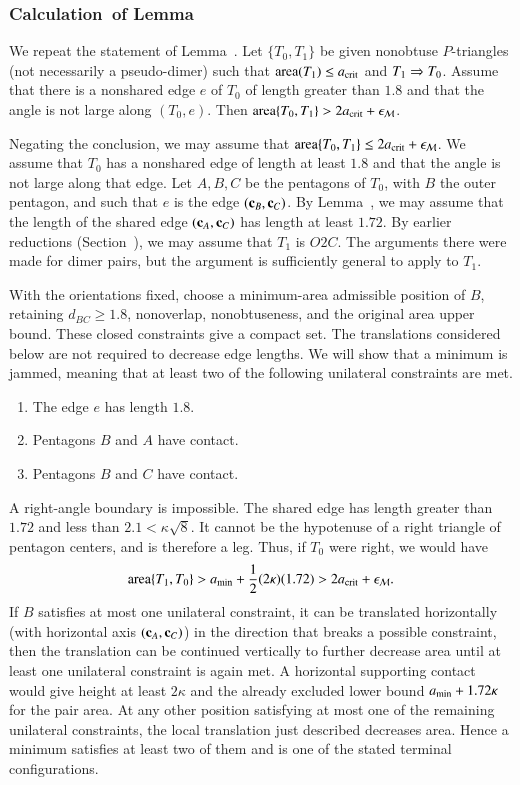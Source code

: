 \subsubsection{Calculation~of Lemma~} %

We repeat the statement of Lemma~.  Let $\{T_0,T_1\}$
be given nonobtuse $P$-triangles (not necessarily a pseudo-dimer) such that
${\operatorname{area}}(T_1)\le a_\text{crit}$ and $T_1\Rightarrow T_0$.  Assume that there is a
nonshared edge $e$ of $T_0$ of length greater than $1.8$ and that the
angle is not large along $(T_0,e)$.  Then ${\operatorname{area}}\{T_0,T_1\} > 2a_\text{crit}
+ \epsilon_{\mathcal M}$. %

Negating the conclusion, we may assume that ${\operatorname{area}}\{T_0,T_1\}\le
2a_\text{crit} + \epsilon_{\mathcal M}$.  We assume that $T_0$ has a nonshared edge of length
at least $1.8$ and that the angle is not large along that edge.
Let $A,B,C$ be the pentagons of $T_0$, with $B$ the outer pentagon,
and such that $e$ is the edge $({\mathbf c}_B,{\mathbf c}_C)$.
By Lemma~, we may assume that the length of the
shared edge $({\mathbf c}_A,{\mathbf c}_C)$ has length at least $1.72$.
By earlier reductions (Section~), we may assume
that $T_1$ is $O2C$.  The arguments there were made for dimer pairs, but the argument
is sufficiently general to apply to $T_1$.

With the orientations fixed, choose a minimum-area admissible
position of $B$, retaining $d_{BC}\ge1.8$, nonoverlap,
nonobtuseness, and the original area upper bound. These closed
constraints give a compact set. The translations considered below
are not required to decrease edge lengths. We will show that a
minimum is jammed, meaning that at least two of the following
unilateral constraints are met.
\begin{enumerate}
\item The edge $e$ has length $1.8$.
\item Pentagons $B$ and $A$ have contact.
\item Pentagons $B$ and $C$ have contact.
\end{enumerate}
 
A right-angle boundary is impossible. The shared edge has length
greater than $1.72$ and less than $2.1<\kappa\sqrt8$. It cannot be
the hypotenuse of a right triangle of pentagon centers, and is
therefore a leg. Thus, if $T_0$ were right, we would have
\[
{\operatorname{area}}\{T_1,T_0\} > a_\text{min} + \frac12(2\kappa)(1.72) > 2 a_\text{crit} + \epsilon_{\mathcal M}.
\]
If $B$ satisfies at most one unilateral constraint, it can be translated
horizontally (with horizontal axis $({\mathbf c}_A,{\mathbf c}_C)$) in the direction that breaks a
possible constraint,
then the translation can be continued vertically to further decrease area until
at least one unilateral constraint is again met.
A horizontal supporting contact would give height at least
$2\kappa$ and the already excluded lower bound $a_\text{min}+1.72\kappa$
for the pair area. At any other position satisfying at most one
of the remaining unilateral constraints, the local translation
just described decreases area. Hence a minimum satisfies at least
two of them and is one of the stated terminal configurations.

